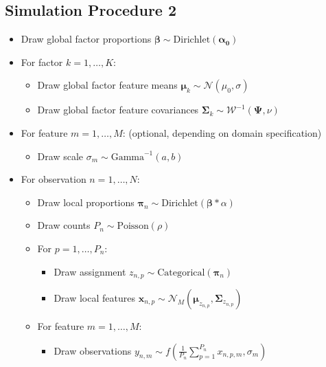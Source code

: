 \documentclass[twoside,11pt]{article}
\begin{document}
\subsection{Simulation Procedure 2}
\label{app:sim2}
\begin{itemize}
    \item Draw global factor proportions $\boldsymbol{\beta} \sim \mbox{Dirichlet}(\boldsymbol{\alpha_0})$
    \item For factor $k=1,\dots,K$:
    \begin{itemize}
        \item Draw global factor feature means $\boldsymbol{\mu}_k \sim \mathcal{N}(\mu_0, \sigma)$
        \item Draw global factor feature covariances $\boldsymbol{\Sigma}_k \sim \mathcal{W}^{-1}(\boldsymbol{\Psi}, \nu)$
    \end{itemize}
    \item For feature $m=1,\dots,M$: (optional, depending on domain specification)
    \begin{itemize}
        \item Draw scale $\sigma_m \sim \mbox{Gamma}^{-1}(a, b)$
    \end{itemize}
    \item For observation $n=1,\dots,N$:
    \begin{itemize}
        \item Draw local proportions $\boldsymbol{\pi}_n \sim \mbox{Dirichlet}( \boldsymbol{\beta}*\alpha)$
        \item Draw counts $P_n \sim \mbox{Poisson}(\rho)$
        \item For $p=1,\dots,P_n$:
        \begin{itemize}
            \item Draw assignment $z_{n,p} \sim \mbox{Categorical}(\boldsymbol{\pi}_n)$
            \item Draw local features $\boldsymbol{x}_{n,p} \sim \mathcal{N}_M(\boldsymbol{\mu}_{z_{n,p}}, \boldsymbol{\Sigma}_{z_{n,p}})$
        \end{itemize}
        \item For feature $m=1,\dots,M$:
        \begin{itemize}
            \item Draw observations $y_{n,m} \sim f\left(\frac{1}{P_n}\sum_{p=1}^{P_n} x_{n,p,m}, \sigma_m \right)$ 
        \end{itemize}
    \end{itemize}
\end{itemize}
\end{document}
